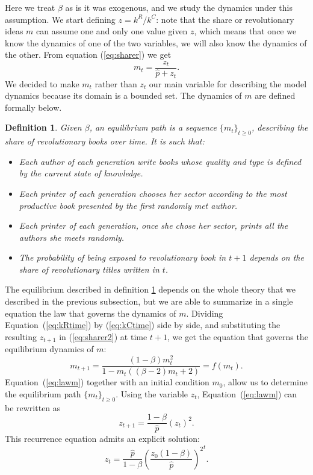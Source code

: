 \documentclass[12pt]{article}
\newtheorem{definition}{Definition}
\begin{document}
Here we treat $\beta$ as is it was exogenous, and we study the dynamics under this assumption. We start defining $z=k^R/k^C$: note that the share or revolutionary ideas $m$ can assume one and only one value given $z$, which means that once we know the dynamics of one of the two variables, we will also know the dynamics of the other. From equation (\ref{eq:sharer}) we get
\begin{equation}
m_t=\frac{z_t}{\hat{p}+z_t}\label{eq:sharer2}.
\end{equation}
 We decided to make $m_t$ rather than $z_t$ our main variable for describing the model dynamics because its domain is a bounded set.
 The dynamics of $m$ are defined formally below.
\begin{definition}\label{definition:equilibrium}
	Given $\beta$, an equilibrium path is a sequence $\{m_t\}_{t\geq0}$, describing the share of revolutionary books over time. It is such that:
	\begin{itemize}
	\item Each author of each generation write books whose quality and type is defined by the current state of knowledge.
	\item Each printer of each generation chooses her sector according to the most productive book presented by the first randomly met author.
	\item Each printer of each generation, once she chose her sector, prints all the authors she meets randomly.
	\item The probability of being exposed to revolutionary book in $t+1$ depends on the share of revolutionary titles written in $t$.
	\end{itemize}
\end{definition}
The equilibrium described in definition \ref{definition:equilibrium} depends on the whole theory that we described in the previous subsection, but we are able to summarize in a single equation the law that governs the dynamics of $m$.
Dividing Equation~(\ref{eq:kRtime}) by (\ref{eq:kCtime}) side by side, and substituting the resulting $z_{t+1}$ in (\ref{eq:sharer2}) at time $t+1$, we get the equation that governs the equilibrium dynamics of $m$:
\begin{equation}
m_{t+1}=\frac{(1-\beta) m_t^2}{1-m_t ((\beta -2) m_t+2)}=f(m_t)\label{eq:lawm}.
\end{equation}
Equation~(\ref{eq:lawm}) together with an initial condition $m_0$, allow us to determine the equilibrium path $\{m_t\}_{t\geq0}$. Using the variable $z_t$, Equation~(\ref{eq:lawm}) can be rewritten as
$$
z_{t+1} = \frac{1-\beta}{\hat{p}} (z_t)^2.
$$
This recurrence equation admits an explicit solution:
\begin{equation}
z_t=\frac{\hat{p}}{1-\beta}{\left(\frac{z_0 (1-\beta)}{\hat{p}}\right)^2}^t.
\end{equation}
\end{document}
